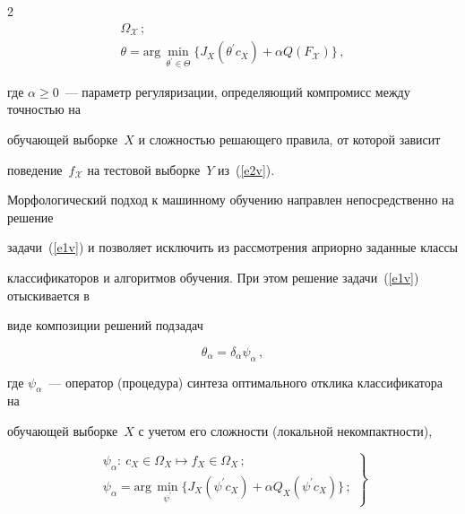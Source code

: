 \begin{multicols}{2}
\begin{gather*}
\Omega_{\mathcal{X}}\,;\\

\theta = \mathrm{arg}\,\min\limits_{\theta^\prime\in \Theta} \{J_X(\theta^\prime c_X)+\alpha 

Q(F_{\mathcal{X}})\}\,,

\end{gather*}

где $\alpha \geq 0$~--- параметр регуляризации, опре\-де\-ля\-ющий компромисс между точностью на 

обучающей выборке~$X$ и сложностью решающего правила, от которой зависит 

поведение~$f_{\mathcal{X}}$ на тестовой выборке~$Y$ из~(\ref{e2v}).



Морфологический подход к машинному обучению направлен непосредственно на решение 

задачи~(\ref{e1v}) и позволяет исключить из рассмотрения априорно заданные классы 

классификаторов и алгоритмов обучения. При этом решение задачи~(\ref{e1v}) отыскивается в 

виде композиции решений подзадач

\begin{equation}

\theta_\alpha = \delta_\alpha \psi_\alpha\,,

\label{e4v}

\end{equation}

где $\psi_\alpha$~--- оператор (процедура) синтеза оптимального отклика классификатора на 

обучающей выборке~$X$ с учетом его сложности (локальной некомпактности),

\begin{equation}

\left.

\begin{array}{c}

\psi_\alpha:\ c_X\in \Omega_X\mapsto f_X\in\Omega_X\,;\\[9pt]

\psi_\alpha=\mathrm{arg}\, \min\limits_{\psi^\prime} \{J_X(\psi^\prime c_X)+\alpha Q_X(\psi^\prime c_X)\}\,;

\end{array}

\right \}

\label{e5v}

\end{equation}


\end{multicols}
